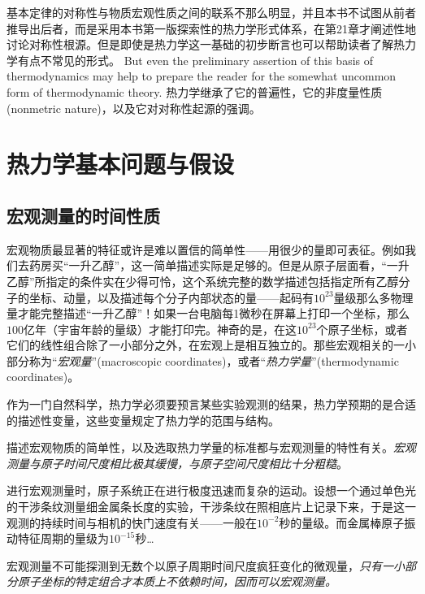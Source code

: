 基本定律的对称性与物质宏观性质之间的联系不那么明显，并且本书不试图从前者推导出后者，而是采用本书第一版探索性的热力学形式体系，在第21章才阐述性地讨论对称性根源。但是即使是热力学这一基础的初步断言也可以帮助读者了解热力学有点不常见的形式。{\color{red} But even the preliminary assertion of this basis of thermodynamics may help to prepare the reader for the somewhat uncommon form of thermodynamic theory.}  热力学继承了它的普遍性，它的非度量性质(nonmetric nature)，以及它对对称性起源的强调。

\chapter{热力学基本问题与假设}
\label{chap1}
\section{宏观测量的时间性质}
\label{sec1.1}
宏观物质最显著的特征或许是难以置信的简单性——用很少的量即可表征。例如我们去药房买“一升乙醇”，这一简单描述实际是足够的。但是从原子层面看，“一升乙醇”所指定的条件实在少得可怜，这个系统完整的数学描述包括指定所有乙醇分子的坐标、动量，以及描述每个分子内部状态的量——起码有$10^{23}$量级那么多物理量才能完整描述“一升乙醇”！如果一台电脑每1微秒在屏幕上打印一个坐标，那么$100$亿年（宇宙年龄的量级）才能打印完。神奇的是，在这$10^{23}$个原子坐标，或者它们的线性组合除了一小部分之外，在宏观上是相互独立的。那些宏观相关的一小部分称为“{\it 宏观量}”(macroscopic coordinates)，或者“{\it 热力学量}”(thermodynamic coordinates)。

作为一门自然科学，热力学必须要预言某些实验观测的结果，热力学预期的是合适的描述性变量，这些变量规定了热力学的范围与结构。

描述宏观物质的简单性，以及选取热力学量的标准都与宏观测量的特性有关。{\it 宏观测量与原子时间尺度相比极其缓慢，与原子空间尺度相比十分粗糙}。

进行宏观测量时，原子系统正在进行极度迅速而复杂的运动。设想一个通过单色光的干涉条纹测量细金属条长度的实验，干涉条纹在照相底片上记录下来，于是这一观测的持续时间与相机的快门速度有关——一般在$10^{-2}$秒的量级。而金属棒原子振动特征周期的量级为$10^{-15}$秒…

宏观测量不可能探测到无数个以原子周期时间尺度疯狂变化的微观量，{\it 只有一小部分原子坐标的特定组合才本质上不依赖时间，因而可以宏观测量。}

